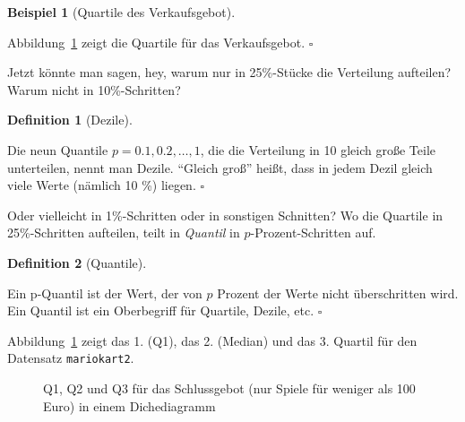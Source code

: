 \documentclass[
  letterpaper,
  oneside,
  open=any]{scrbook}
\theoremstyle{definition}
\theoremstyle{definition}
\newtheorem{example}{Beispiel}[chapter]
\theoremstyle{definition}
\newtheorem{definition}{Definition}[chapter]
\theoremstyle{remark}
\begin{document}
\begin{example}[Quartile des
Verkaufsgebot]\protect\hypertarget{exm-mario-qs}{}\label{exm-mario-qs}

Abbildung~\ref{fig-mario-qs1} zeigt die Quartile für das Verkaufsgebot.
\(\square\)

\end{example}

Jetzt könnte man sagen, hey, warum nur in 25\%-Stücke die Verteilung
aufteilen? Warum nicht in 10\%-Schritten?

\begin{definition}[Dezile]\protect\hypertarget{def-dezile}{}\label{def-dezile}

Die neun Quantile \(p= 0.1, 0.2, \ldots, 1\), die die Verteilung in 10
gleich große Teile unterteilen, nennt man Dezile. \enquote{Gleich groß}
heißt, dass in jedem Dezil gleich viele Werte (nämlich 10 \%) liegen.
\(\square\)

\end{definition}

Oder vielleicht in 1\%-Schritten oder in sonstigen Schnitten? Wo die
Quartile in 25\%-Schritten aufteilen, teilt in \emph{Quantil} in
\(p\)-Prozent-Schritten auf.

\begin{definition}[Quantile]\protect\hypertarget{def-quantile}{}\label{def-quantile}

Ein p-Quantil ist der Wert, der von \(p\) Prozent der Werte nicht
überschritten wird. Ein Quantil ist ein Oberbegriff für Quartile,
Dezile, etc. \(\square\)

\end{definition}

Abbildung~\ref{fig-mario-qs1} zeigt das 1. (Q1), das 2. (Median) und das
3. Quartil für den Datensatz \texttt{mariokart2}.

\begin{figure}


\caption{\label{fig-mario-qs1}Q1, Q2 und Q3 für das Schlussgebot (nur
Spiele für weniger als 100 Euro) in einem Dichediagramm}

\end{figure}%
\end{document}
